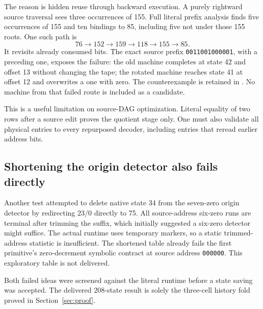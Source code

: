 \documentclass[11pt,letterpaper]{article}
\begin{document}
The reason is hidden reuse through backward execution. A purely rightward
source traversal sees three occurrences of 155. Full literal prefix
analysis finds five occurrences of 155 and ten bindings to 85, including
five not under those 155 roots. One such path is
\[
76\to152\to159\to118\to155\to85.
\]
It revisits already consumed bits. The exact source prefix
\texttt{0011001000001}, with a preceding one, exposes the failure: the old
machine completes at state 42 and offset 13 without changing the tape;
the rotated machine reaches state 41 at offset 12 and overwrites a one
with zero. The counterexample is retained in
. No machine from that failed route
is included as a candidate.

This is a useful limitation on source-DAG optimization. Literal equality
of two rows after a source edit proves the quotient stage only. One must
also validate all physical entries to every repurposed decoder, including
entries that reread earlier address bits.

\subsection{Shortening the origin detector also fails directly}

Another test attempted to delete native state 34 from the seven-zero origin
detector by redirecting $23/0$ directly to 75. All source-address six-zero
runs are terminal after trimming the suffix, which initially suggested a
six-zero detector might suffice. The actual runtime uses temporary markers,
so a static trimmed-address statistic is insufficient. The shortened table
already fails the first primitive's zero-decrement symbolic contract at
source address \texttt{000000}. This exploratory table is not delivered.

Both failed ideas were screened against the literal runtime before a state
saving was accepted. The delivered 208-state result is solely the
three-cell history fold proved in Section~\ref{sec:proof}.
\end{document}
